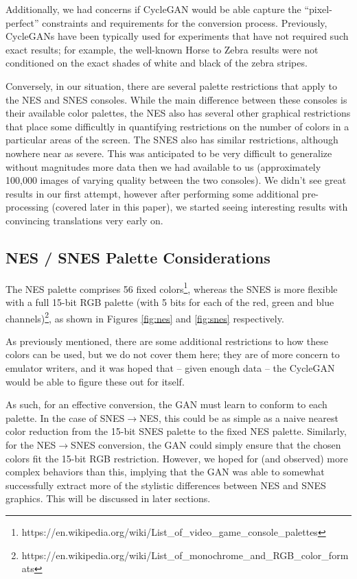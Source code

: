 \documentclass[10pt,twocolumn,letterpaper]{article}
\begin{document}
Additionally, we had concerns if CycleGAN would be able capture the ``pixel-perfect'' constraints and requirements for the conversion process. Previously, CycleGANs have been typically used for experiments that have not required such exact results; for example, the well-known Horse to Zebra results were not conditioned on the exact shades of white and black of the zebra stripes.

Conversely, in our situation, there are several palette restrictions that apply to the NES and SNES consoles. While the main difference between these consoles is their available color palettes, the NES also has several other graphical restrictions that place some difficultly in quantifying restrictions on the number of colors in a particular areas of the screen. The SNES also has similar restrictions, although nowhere near as severe. This was anticipated to be very difficult to generalize without magnitudes more data then we had available to us (approximately 100,000 images of varying quality between the two consoles). We didn't see great results in our first attempt, however after performing some additional pre-processing (covered later in this paper), we started seeing interesting results with convincing translations very early on.


\subsection{NES / SNES Palette Considerations}
The NES palette comprises 56 fixed colors\footnote{https://en.wikipedia.org/wiki/List\_of\_video\_game\_console\_palettes}, whereas the SNES is more flexible with a full 15-bit RGB palette (with 5 bits for each of the red, green and blue channels)\footnote{https://en.wikipedia.org/wiki/List\_of\_monochrome\_and\_RGB\_color\_formats}, as shown in Figures \ref{fig:nes} and \ref{fig:snes} respectively.

As previously mentioned, there are some additional restrictions to how these colors can be used, but we do not cover them here; they are of more concern to emulator writers, and it was hoped that \--- given enough data \--- the CycleGAN would be able to figure these out for itself.

As such, for an effective conversion, the GAN must learn to conform to each palette. In the case of SNES${\rightarrow}$NES, this could be as simple as a naive nearest color reduction from the 15-bit SNES palette to the fixed NES palette. Similarly, for the NES${\rightarrow}$SNES conversion, the GAN could simply ensure that the chosen colors fit the 15-bit RGB restriction. However, we hoped for (and observed) more complex behaviors than this, implying that the GAN was able to somewhat successfully extract more of the stylistic differences between NES and SNES graphics. This will be discussed in later sections.
\end{document}
